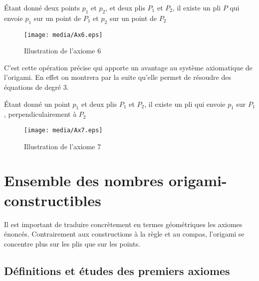 \documentclass[a4paper,12pt,french]{report}
\begin{document}
		
		\begin{axiome}[6]
			Étant donné deux points $p_{1}$ et $p_{2}$, et deux plis $P_{1}$ et $P_{2}$, il existe un pli $P$ qui envoie $p_{1}$ sur un point de $P_{1}$ et $p_{2}$ sur un point de $P_{2}$
		\end{axiome}
		\begin{figure}
		    \begin{center}
			\texttt{[image: media/Ax6.eps]}
		    \end{center}
			\caption{Illustration de l'axiome 6}
		\end{figure}
		 C'est cette opération précise qui apporte un avantage au système axiomatique de l'origami. En effet on montrera par la suite qu'elle permet de résoudre des équations de degré 3.
		
		
		\begin{axiome}[7]
			Étant donné un point $p_{1}$ et deux plis $P_{1}$ et $P_{2}$, il existe un pli qui envoie $p_{1}$ sur $P_{1}$, perpendiculairement à $P_{2}$
		\end{axiome}
		\begin{figure}
		    \begin{center}
			\texttt{[image: media/Ax7.eps]}
		    \end{center}
			\caption{Illustration de l'axiome 7}
		\end{figure}
		

\section{Ensemble des nombres origami-constructibles}
			Il est important de traduire concrètement en termes géométriques les axiomes énoncés. Contrairement aux constructions à la règle et au compas, l'origami se concentre plus sur les plis que sur les points.

	
\subsection{Définitions et études des premiers axiomes}
\end{document}
